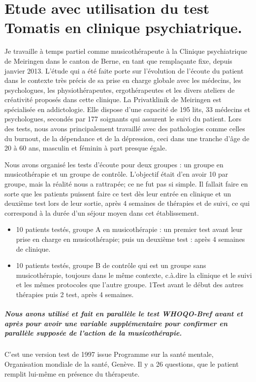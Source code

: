 \chapter{Etude avec utilisation du test Tomatis en clinique psychiatrique.}
Je travaille à temps partiel comme musicothérapeute à la Clinique psychiatrique de Meiringen dans le canton de Berne, en tant que remplaçante fixe, depuis janvier 2013. L'étude qui a été faite porte sur l'évolution de l'écoute du patient dans le contexte très précis de sa prise en charge globale avec les médecins, les psychologues, les physiothérapeutes, ergothérapeutes et les divers ateliers de créativité proposés dans cette clinique. La Privatklinik de Meiringen est spécialisée en addictologie. Elle dispose d'une capacité de 195 lits, 33 médecins et psychologues, secondés par 177 soignants qui assurent le suivi du patient. Lors des tests, nous avons principalement travaillé avec des pathologies comme celles du burnout, de la dépendance et de la  dépression, ceci dans une tranche d'âge de 20 à 60 ans, masculin et féminin à part presque égale.

Nous avons  organisé  les tests d'écoute pour deux groupes : un
groupe en musicothérapie et un groupe de contrôle. L'objectif était d'en avoir 10 par groupe, mais la réalité nous a rattrapée; ce ne fut pas si simple. Il fallait faire en sorte que les patients puissent faire ce test dès leur entrée en clinique et un deuxième test lors de leur sortie, après 4 semaines de thérapies et de suivi, ce qui correspond à la durée d'un séjour moyen dans cet établissement.
\begin{itemize}
	\item 10 patients testés, groupe A en musicothérapie :  un premier test avant leur prise en
	charge en musicothérapie; puis un deuxième test \textdegree{}  : après 4 semaines de
	clinique. 
	\item 10 patients testés, groupe B de contrôle qui est un groupe sans musicothérapie,
	toujours dans le même contexte, c.à.dire la clinique et le suivi et les mêmes protocoles que l'autre groupe. 1\textdegree Test avant
	le début des autres thérapies  puis 2\textdegree{} test, après 4 semaines.
\end{itemize}
 \paragraph{Nous avons utilisé et fait en parallèle le test WHOQO-Bref avant
	et après pour avoir une variable supplémentaire pour confirmer en
	parallèle supposée de l'action de la musicothérapie.}
C'est une version test de 1997 issue Programme sur la santé mentale,
Organisation mondiale de la santé, Genève. Il y a 26 questions, que
le patient remplit lui-même en présence du thérapeute. 



